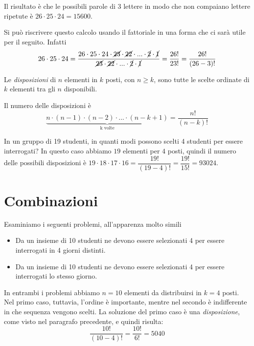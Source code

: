 Il risultato è che le possibili parole di 3 lettere in modo che non compaiano 
lettere ripetute è $26 \cdot 25 \cdot 24 = 15600$.

Si può riscrivere questo calcolo usando il fattoriale in una forma che ci sarà 
utile per il seguito. Infatti $$26 \cdot 25 \cdot 24 =\dfrac{26 \cdot 25 \cdot 
24 \cdot \cancel{23} \cdot \cancel{22} \cdot ... \cdot 
\cancel{2}\cdot\cancel{1}}{\cancel{23} \cdot \cancel{22} \cdot ... \cdot 
\cancel{2}\cdot\cancel{1}} = \dfrac{26!}{23!}=\dfrac{26!}{(26-3)!}$$

\begin{definizione}
Le \emph{disposizioni} di $n$ elementi in $k$ posti, con $n\geq k$, sono tutte 
le scelte ordinate di $k$ elementi tra gli $n$ disponibili. 


Il numero delle disposizioni è
$$\underbrace{n\cdot (n-1) \cdot (n-2) \cdot ... \cdot (n-k+1)}_{\text{k 
volte}}=\dfrac{n!}{(n-k)!}$$
\end{definizione}

\begin{esempio}
In un gruppo di 19 studenti, in quanti modi possono scelti 4 studenti per 
essere interrogati?
In questo caso abbiamo $19$ elementi per $4$ posti, quindi il numero delle 
possibili disposizioni è
$19\cdot 18 \cdot 17 \cdot 16 = \dfrac{19!}{(19-4)!}= \dfrac{19!}{15!} = 93024$.

\end{esempio}

\section{Combinazioni}
\label{sec:04_combinazioni}
Esaminiamo i seguenti problemi, all'apparenza molto simili
\begin{itemize} [nosep]
\item Da un insieme di 10 studenti ne devono essere selezionati 4 per essere 
interrogati in 4 giorni distinti.
\item Da un insieme di 10 studenti ne devono essere selezionati 4 per essere 
interrogati lo stesso giorno.
\end{itemize}
In entrambi i problemi abbiamo $n=10$ elementi da distribuirsi in $k=4$ posti. 
Nel primo caso, tuttavia, l'ordine è importante, mentre nel secondo 
è indifferente in che sequenza vengono scelti.
La soluzione del primo caso è una \emph{disposizione}, come visto nel paragrafo 
precedente, e quindi risulta:
$$\dfrac{10!}{(10-4)!}=\dfrac{10!}{6!}=5040$$

